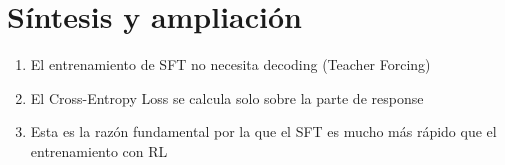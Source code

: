 \section{Síntesis y ampliación}
\begin{enumerate}
  \item El entrenamiento de SFT no necesita decoding (Teacher Forcing)
  \item El Cross-Entropy Loss se calcula solo sobre la parte de response
  \item Esta es la razón fundamental por la que el SFT es mucho más rápido que el entrenamiento con RL
\end{enumerate}

